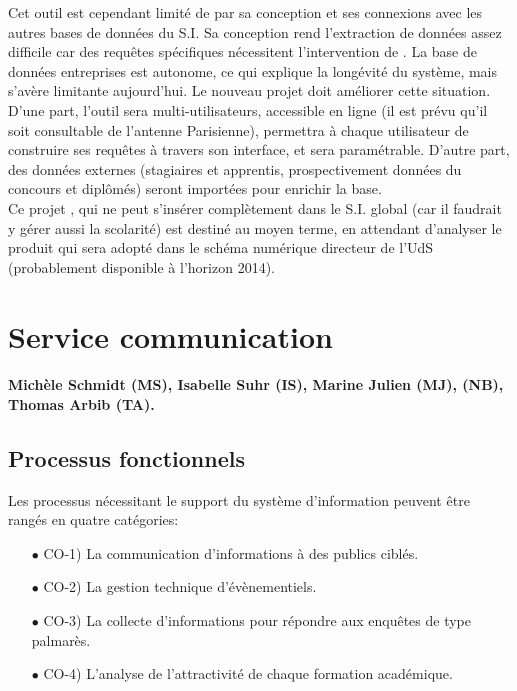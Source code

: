 \documentclass{book}
\begin{document}
Cet outil est cependant  limité de par sa conception et  ses connexions avec les
autres bases de données du S.I. Sa conception rend l'extraction de données assez
difficile car  des requêtes  spécifiques nécessitent  l'intervention de  \CK. La
base  de données  entreprises  est autonome,  ce qui  explique  la longévité  du
système,  mais s'avère  limitante aujourd'hui.   Le nouveau  projet 
doit  améliorer cette  situation. D'une  part, l'outil  sera multi-utilisateurs,
accessible  en  ligne  (il  est   prévu  qu'il  soit  consultable  de  l'antenne
Parisienne), permettra à chaque utilisateur de construire ses requêtes à travers
son  interface,  et  sera  paramétrable.  D'autre  part,  des  données  externes
(stagiaires  et  apprentis, prospectivement  données  du  concours et  diplômés)
seront importées pour enrichir la base.\\

Ce projet ,  qui ne peut s'insérer complètement dans  le S.I. global
(car il  faudrait y  gérer aussi la  scolarité) est destiné  au moyen  terme, en
attendant  d'analyser le  produit   qui sera  adopté dans  le schéma
numérique directeur de l'UdS (probablement disponible à l'horizon 2014).

  

\section{Service communication}

\paragraph{Michèle Schmidt (MS), Isabelle Suhr (IS), Marine Julien (MJ), 
\NB (NB), Thomas Arbib (TA).}

\subsection{Processus fonctionnels}
Les processus nécessitant le support du système d'information peuvent 
être rangés en quatre catégories:
\begin{itemize}
\item[$\bullet$] CO-1) La communication d'informations à des publics ciblés.
\item[$\bullet$] CO-2) La gestion technique d'évènementiels.
\item[$\bullet$] CO-3) La collecte d'informations pour répondre aux enquêtes de type 
      palmarès.
\item[$\bullet$] CO-4) L'analyse de l'attractivité de chaque formation académique.
\end{itemize}
\bigskip
\end{document}
